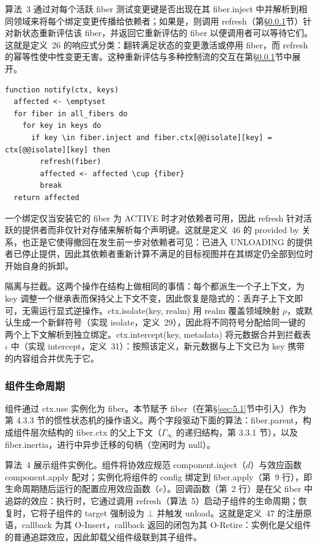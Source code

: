 算法~3 通过对每个活跃 fiber 测试变更键是否出现在其 fiber.inject 中并解析到相同领域来将每个绑定变更传播给依赖者；如果是，则调用 refresh（第\S\ref{sec:5.1.3}节）针对新状态重新评估该 fiber，并返回它重新评估的 fiber 以便调用者可以等待它们。这就是定义~26 的响应式分类：翻转满足状态的变更激活或停用 fiber，而 refresh 的幂等性使中性变更无害。这种重新评估与多种控制流的交互在第\S\ref{sec:5.1.3}节中展开。

\begin{lstlisting}[caption={响应式通知}]
function notify(ctx, keys)
  affected <- \emptyset
  for fiber in all_fibers do
    for key in keys do
      if key \in fiber.inject and fiber.ctx[@@isolate][key] = ctx[@@isolate][key] then
        refresh(fiber)
        affected <- affected \cup {fiber}
        break
  return affected
\end{lstlisting}

一个绑定仅当安装它的 fiber 为 ACTIVE 时才对依赖者可用，因此 refresh 针对活跃的提供者而非仅针对存储来解析每个声明键。这就是定义~46 的 provided by 关系，也正是它使得撤回在发生前一步对依赖者可见：已进入 UNLOADING 的提供者已停止提供，因此其依赖者重新计算不满足的目标视图并在其绑定仍全部到位时开始自身的拆卸。

隔离与拦截。这两个操作在结构上做相同的事情：每个都派生一个子上下文，为 key 调整一个继承表而保持父上下文不变，因此恢复是隐式的：丢弃子上下文即可，无需运行显式逆操作。ctx.isolate(key, realm) 用 realm 覆盖领域映射 $\rho$，或默认生成一个新鲜符号（实现 isolate，定义~29），因此将不同符号分配给同一键的两个上下文解析到独立绑定。ctx.intercept(key, metadata) 将元数据合并到拦截表 $\iota$ 中（实现 intercept，定义~31）：按照该定义，新元数据与上下文已为 key 携带的内容组合并优先于它。

\subsubsection{组件生命周期}\label{sec:5.1.3}

组件通过 ctx.use 实例化为 fiber。本节赋予 fiber（在第\S\ref{sec:5.1}节中引入）作为第 4.3.3 节的惯性状态机的操作语义。两个字段驱动下面的算法：fiber.parent，构成组件层次结构的 fiber.ctx 的父上下文（$\Gamma_\infty$ 的递归结构，第 3.3.1 节），以及 fiber.inertia，进行中异步迁移的句柄（空闲时为 null）。

算法~4 展示组件实例化。组件将协效应规范 component.inject（$d$）与效应函数 component.apply 配对；实例化将组件的 config 绑定到 fiber.apply（第~9 行），即生命周期随后运行的配置应用效应函数（$e$）。回调函数（第~2 行）是在父 fiber 中追踪的效应：执行时，它通过调用 refresh（算法~5）启动子组件的生命周期；恢复时，它将子组件的 target 强制设为 $\bot$ 并触发 unload。这就是定义~47 的注册原语，callback 为其 O-Insert，callback 返回的闭包为其 O-Retire：实例化是父组件的普通追踪效应，因此卸载父组件级联到其子组件。

